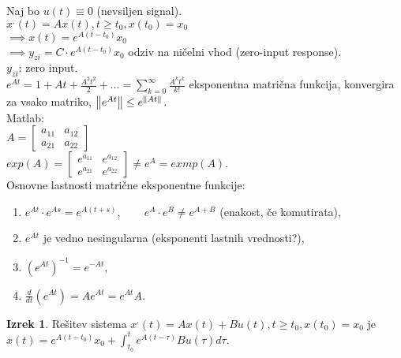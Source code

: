 \documentclass[a4paper, 12pt]{book}
\theoremstyle{definition}
\newtheorem{theorem}[counter]{Izrek}
\theoremstyle{remark}
\begin{document}
Naj bo $u(t) \equiv 0$ (nevsiljen signal). \\
$x^{.}(t) = Ax(t), t \geq t_0, x(t_0) = x_0$ \\
$\implies x(t) = e^{A(t-t_0)} x_0$ \\
$\implies y_{zi} = C \cdot e^{A(t-t_0)} x_0$ odziv na ničelni vhod (zero-input response). \\
$y_{zi}$: zero input. \\
$e^{At} = 1 + At + \frac{A^2 t^2}{2} + \dots = \sum_{k=0}^{\infty} \frac{A^k t^k}{k!}$ eksponentna matrična funkcija,
konvergira za vsako matriko, $\norm{e^{At}} \leq e^{\norm{At}}$. \\
Matlab: \\
$A = \begin{bmatrix} a_{11} & a_{12} \\ a_{21} & a_{22} \end{bmatrix}$ \\
$exp(A) = \begin{bmatrix} e^{a_{11}} & e^{a_{12}} \\ e^{a_{21}} & e^{a_{22}} \end{bmatrix}
\neq e^A = exmp(A)$. \\
Osnovne lastnosti matrične eksponentne funkcije:
\begin{enumerate}[label=\arabic*)]
    \item $e^{At} \cdot e^{As} = e^{A(t+s)}, \qquad e^A \cdot e^B \neq e^{A+B}$ (enakost, če komutirata),
    \item $e^{At}$ je vedno nesingularna (eksponenti lastnih vrednosti?),
    \item $\left(e^{At}\right)^{-1} = e^{-At}$,
    \item $\frac{d}{dt} \left(e^{At}\right) = A e^{At} = e^{At} A$.
\end{enumerate}
\begin{theorem}
    Rešitev sistema $x^{.}(t) = Ax(t) + Bu(t), t \geq t_0, x(t_0) = x_0$ je
    $x(t) = e^{A(t-t_0)} x_0 + \int_{t_0}^t e^{A(t-\tau)} Bu(\tau) d\tau$.
\end{theorem}
\end{document}
